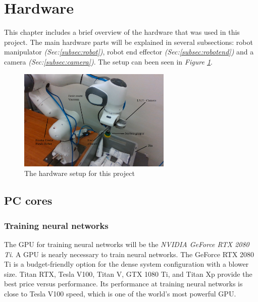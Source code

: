 \clearpage
\section{Hardware \label{sec:hardware}}
This chapter includes a brief overview of the hardware that was used in this project. The main hardware parts will be explained in several subsections: robot manipulator \textit{(Sec:\ref{subsec:robot})}, robot end effector \textit{(Sec:\ref{subsec:robotend})} and a camera \textit{(Sec:\ref{subsec:camera})}. The setup can been seen in \textit{Figure \ref{fig:setupproject}}.

\begin{figure}[h]
    \centering
    \includegraphics[width = 0.65\textwidth]{graphics/setup.jpg}
    \caption{The hardware setup for this project}
    \label{fig:setupproject}
\end{figure}
\linespread{0}
\subsection{PC cores}
\vspace{0.8cm}
\subsubsection*{Training neural networks}
The GPU for training neural networks will be the \textit{NVIDIA GeForce RTX 2080 Ti}\cite{noauthor_graphics_nodate}.
A GPU is nearly necessary to train neural networks. The GeForce RTX 2080 Ti is a budget-friendly option for the dense system configuration with a blower size. Titan RTX, Tesla V100, Titan V, GTX 1080 Ti, and Titan Xp provide the best price versus performance. Its performance at training neural networks is close to Tesla V100 speed, which is one of the world's most powerful GPU\cite{noauthor_deep_2018}. 

